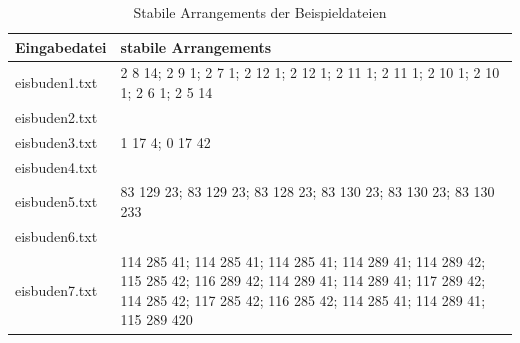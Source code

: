 \documentclass[a4paper,10pt,ngerman,captions=figureheading]{scrartcl}
\begin{document}
\begin{table}[ht]
    \begin{center}
        \begin{tabularx}{\linewidth}{l|X}
            \textbf{Eingabedatei} & \textbf{stabile Arrangements}                                                                                                                                                                   \\
            \midrule
            eisbuden1.txt         & 2 8 14; 2 9 1; 2 7 1; 2 12 1; 2 12 1; 2 11 1; 2 11 1; 2 10 1; 2 10 1; 2 6 1; 2 5 14                                                                                                             \\
            \midrule
            eisbuden2.txt         &                                                                                                                                                                                                 \\
            \midrule
            eisbuden3.txt         & 1 17 4; 0 17 42                                                                                                                                                                                 \\
            \midrule
            eisbuden4.txt         &                                                                                                                                                                                                 \\
            \midrule
            eisbuden5.txt         & 83 129 23; 83 129 23; 83 128 23; 83 130 23; 83 130 23; 83 130 233                                                                                                                               \\
            \midrule
            eisbuden6.txt         &                                                                                                                                                                                                 \\
            \midrule
            eisbuden7.txt         & 114 285 41; 114 285 41; 114 285 41; 114 289 41; 114 289 42; 115 285 42; 116 289 42; 114 289 41; 114 289 41; 117 289 42; 114 285 42; 117 285 42; 116 285 42; 114 285 41; 114 289 41; 115 289 420 \\
        \end{tabularx}
        \caption{Stabile Arrangements der Beispieldateien}
        \label{tab:BWINF_Beispiele}
    \end{center}
\end{table}
\end{document}
